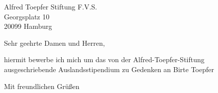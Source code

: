 \documentclass[foldmarks=true,
fromalign=right,fromrule=afteraddress,backaddress=false,
fromphone,fromemail,fromlogo,
version=last]{scrlttr2}
\begin{document}
\begin{letter}{%
Alfred Toepfer Stiftung F.V.S.\\
Georgsplatz 10\\
20099 Hamburg%
}
\opening{Sehr geehrte Damen und Herren,}
hiermit bewerbe ich mich um das von der Alfred-Toepfer-Stiftung ausgeschriebende Auslandsstipendium zu Gedenken an Birte Toepfer 



\closing{Mit freundlichen Grüßen}

\end{letter}
\end{document}

